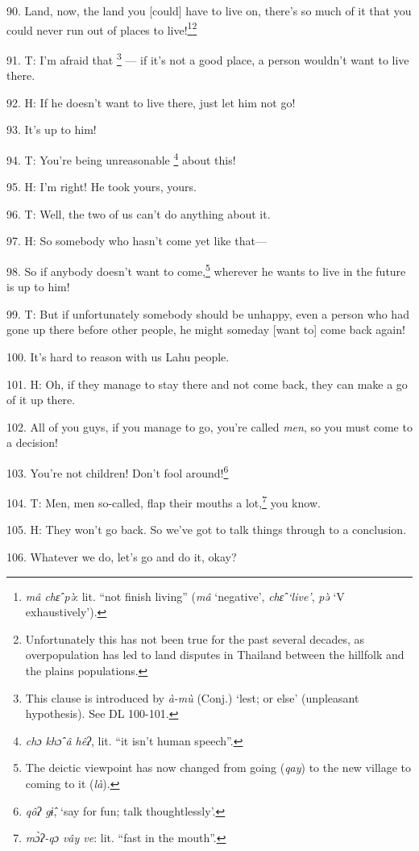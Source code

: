 90. Land, now, the land you [could] have to live on, there's so much of it that
you could never run out of places to live!\footnote{\textit{mâ chɛ̂ pə̀}: lit. ``not finish living'' (\textit{mâ }`negative', \textit{chɛ̂ `live'},\textit{ pə̀ }`V exhaustively').}\footnote{Unfortunately this has not been true for the past several decades, as overpopulation has led to land disputes in Thailand between the hillfolk and the plains populations.}

91. T: I'm afraid that \footnote{This clause is introduced by \textit{à-mù} (Conj.) `lest; or else' (unpleasant hypothesis). See DL 100-101.} --- if it's not a good place, a person wouldn't want
to live there.

92. H: If he doesn't want to live there, just let him not go!

93. It's up to him!

94. T: You're being unreasonable \footnote{\textit{chɔ khɔ̂ â hêʔ}, lit. ``it isn't human speech''.} about this!

95. H: I'm right! He took yours, yours.

96. T: Well, the two of us can't do anything about it.

97. H: So somebody who hasn't come yet like that---

98. So if anybody doesn't want to come,\footnote{The deictic viewpoint has now changed from going (\textit{qay}) to the new village to coming to it (\textit{là}).} wherever he wants to live in the future
is up to him!

99. T: But if unfortunately somebody should be unhappy, even a person who had gone
up there before other people, he might someday [want to] come back again!

100. It's hard to reason with us Lahu people.

101. H: Oh, if they manage to stay there and not come back, they can make a go
of it up there.

102. All of you guys, if you manage to go, you're called \textit{men}, so you must
come to a decision!

103. You're not children! Don't fool around!\footnote{\textit{qôʔ gɨ̂}, `say for fun; talk thoughtlessly'.}

104. T: Men, men so-called, flap their mouths a lot,\footnote{\textit{mɔ̀ʔ-qɔ vây ve}: lit. ``fast in the mouth''.} you know.

105. H: They won't go back. So we've got to talk things through to a conclusion.

106. Whatever we do, let's go and do it, okay?

